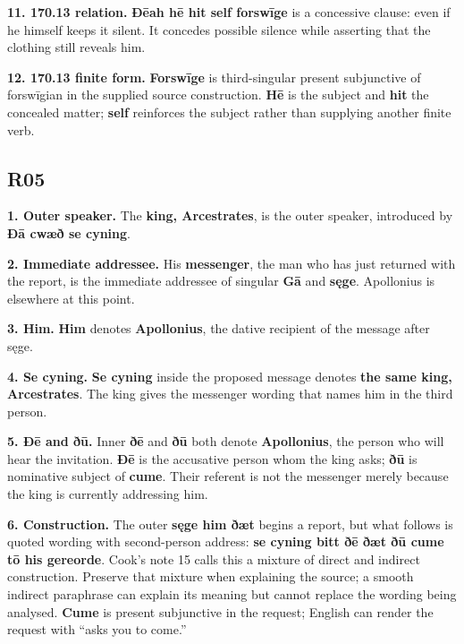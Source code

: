 \textbf{11. 170.13 relation.} \textbf{Ðēah hē hit self forswīge} is a concessive clause: even if he himself keeps it silent. It concedes possible silence while asserting that the clothing still reveals him.

\textbf{12. 170.13 finite form.} \textbf{Forswīge} is third-singular present subjunctive of forswīgian in the supplied source construction. \textbf{Hē} is the subject and \textbf{hit} the concealed matter; \textbf{self} reinforces the subject rather than supplying another finite verb.

\subsection*{R05}

\textbf{1. Outer speaker.} The \textbf{king, Arcestrates}, is the outer speaker, introduced by \textbf{Ðā cwæð se cyning}.

\textbf{2. Immediate addressee.} His \textbf{messenger}, the man who has just returned with the report, is the immediate addressee of singular \textbf{Gā} and \textbf{sęge}. Apollonius is elsewhere at this point.

\textbf{3. Him.} \textbf{Him} denotes \textbf{Apollonius}, the dative recipient of the message after sęge.

\textbf{4. Se cyning.} \textbf{Se cyning} inside the proposed message denotes \textbf{the same king, Arcestrates}. The king gives the messenger wording that names him in the third person.

\textbf{5. Ðē and ðū.} Inner \textbf{ðē} and \textbf{ðū} both denote \textbf{Apollonius}, the person who will hear the invitation. \textbf{Ðē} is the accusative person whom the king asks; \textbf{ðū} is nominative subject of \textbf{cume}. Their referent is not the messenger merely because the king is currently addressing him.

\textbf{6. Construction.} The outer \textbf{sęge him ðæt} begins a report, but what follows is quoted wording with second-person address: \textbf{se cyning bitt ðē ðæt ðū cume tō his gereorde}. Cook’s note 15 calls this a mixture of direct and indirect construction. Preserve that mixture when explaining the source; a smooth indirect paraphrase can explain its meaning but cannot replace the wording being analysed. \textbf{Cume} is present subjunctive in the request; English can render the request with “asks you to come.”

